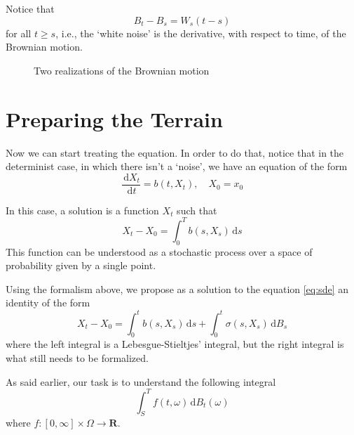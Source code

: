 Notice that
\[
B_t-B_s=W_s(t-s)
\]
for all $t\geq s$, i.e., the `white noise' is the derivative, with respect to time, of the Brownian motion.

\begin{figure}[h!]
\centering
{}
\caption{Two realizations of the Brownian motion \cite{texexchange:brownian-tikz}}
\label{fig:brownian_motion}
\end{figure}

\section{Preparing the Terrain}

Now we can start treating the equation. In order to do that, notice that in the determinist case, in which there isn't a `noise', we have an equation of the form
\begin{equation}
	\frac{\, \mathrm{d} X_t}{\, \mathrm{d} t} = b(t, X_t), \quad X_0 = x_0
\end{equation}

In this case, a solution is a function $X_t$ such that
\begin{equation}
	X_t - X_0 = \int_0^T b(s, X_s) \, \mathrm{d}s
\end{equation}
This function can be understood as a stochastic process over a space of probability given by a single point.

Using the formalism above, we propose as a solution to the equation \eqref{eq:sde} an identity of the form
\begin{equation}\label{eq:sde-sol-prop}
	X_t - X_0 = \int_0^t b(s, X_s) \, \mathrm{d}s + \int_0^t \sigma(s, X_s) \, \mathrm{d}B_s
\end{equation}
where the left integral is a Lebesgue-Stieltjes' integral, but the right integral is what still needs to be formalized. 

As said earlier, our task is to understand the following integral
\begin{equation}\label{eq:gen_ito_integrand}
	\int_S^T f(t, \omega) \, \mathrm{d}B_t(\omega)
\end{equation}
where $f : [0, \infty] \times \Omega \longrightarrow \textbf{R}$.

